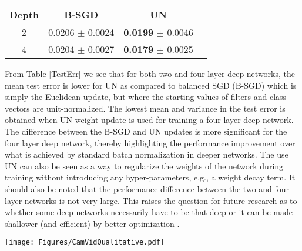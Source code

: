 \documentclass{article} %
\newcommand{\changeBM}[1]{#1} %
\newcommand{\changeVB}[1]{#1} %
\begin{document}
\begin{table*}[t]%
\centering 
\scriptsize{
\begin{tabular}{|c|c|c|c|}
\hline
Depth & B-SGD &  UN \\
\hline
2 &  0.0206 $\pm$ 0.0024 &  \textbf{0.0199} $\pm$ 0.0046 \\
\hline
4 & 0.0204 $\pm$ 0.0027 & \textbf{0.0179} $\pm$ 0.0025 \\
\hline
\end{tabular}}%
\caption{\footnotesize{The test error after the last training epoch measured over $10$ runs on the MNIST dataset. \changeBM{The proposed UN update shows a competitive performance while resolving the symmetries.}} }
\label{TestErr}
\end{table*}











\changeVB{
From Table \ref{TestErr} we see that for both two and four layer deep networks, the mean test error is lower for UN as compared to balanced SGD (B-SGD) which is simply the Euclidean update, but where the starting values of filters and class vectors are unit-normalized. The lowest mean and variance in the test error is obtained when UN weight update is used for training a four layer deep network. The difference between the B-SGD and UN updates is more significant for the four layer deep network, thereby highlighting the performance improvement over what is achieved by \changeBM{standard} batch normalization in deeper networks. The use UN can also be seen as \changeBM{a} way to regularize the weights of the network during training without introducing any hyper-parameters, \changeBM{e.g., a weight decay term}.} It should also be noted that the performance difference between the two and four layer networks is not very large. This raises the question for future research as to whether some deep networks necessarily have to be that deep or it can be made shallower (and efficient) by better optimization \cite{Caruana}. 




\begin{figure*}[t]
\centering
\texttt{[image: Figures/CamVidQualitative.pdf]}
\caption{\footnotesize{SGD with the proposed UN weight updates, shown in Table \ref{ProposedUpdates}, for training SegNet \cite{SegNetarXiv}. The quality of the predictions as compared to the ground truth indicates a successful training of SegNet.}}
\label{CamVidQualy}
\end{figure*}
\end{document}
